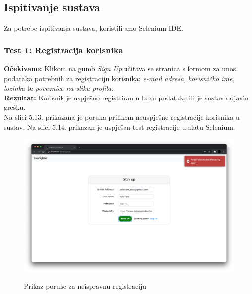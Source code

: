 			\eject
			
			\subsection{Ispitivanje sustava}
			
		    Za potrebe ispitivanja sustava, koristili smo Selenium IDE.
			\subsubsection{Test 1: Registracija korisnika}
			\textbf{Očekivano: } Klikom na gumb \textit{Sign Up} učitava se stranica s formom za unos podataka potrebnih za registraciju korisnika: \textit{e-mail adresa, korisničko ime, lozinka} te \textit{poveznica na sliku profila}.\\
			\textbf{Rezultat: } Korisnik  je  uspješno  registriran  u  bazu  podataka  ili  je  sustav  dojavio grešku.\\
			
			    Na slici 5.13. prikazana je poruka prilikom neuspješne registracije korisnika u sustav. Na slici 5.14. prikazan je uspješan test registracije u alatu Selenium.

			\begin{figure}[H]
				\centering
				\includegraphics[scale=0.27]{slike/SeleniumRegistrationFail.png} \\
				\caption{ Prikaz poruke za neispravnu registraciju}
				\label{fig:SeleniumRegistrationFail}
			\end{figure}

